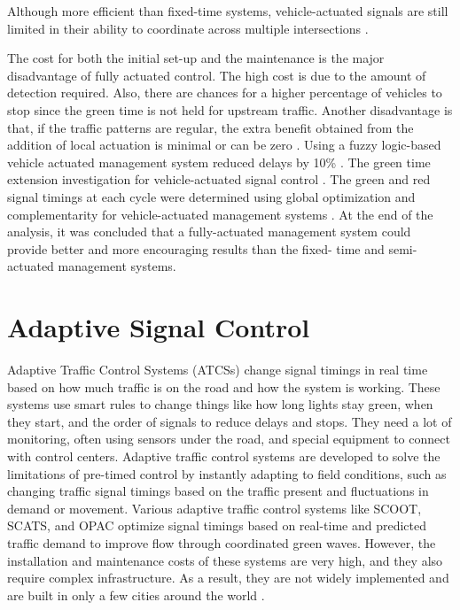 Although more efficient than fixed-time systems, vehicle-actuated 
signals are still limited in their ability to coordinate across 
multiple intersections \cite{brown2019strategies}.

The cost for both the initial set-up and the maintenance is the 
major disadvantage of fully actuated control. The high cost is 
due to the amount of detection required. Also, there are chances 
for a higher percentage of vehicles to stop since the green time 
is not held for upstream traffic. Another disadvantage is that, 
if the traffic patterns are regular, the extra benefit obtained 
from the addition of local actuation is minimal or can be zero 
\cite{fhwa2008}. Using a fuzzy logic-based vehicle actuated management 
system reduced delays by 10\% \cite{trabia1999}. The green time extension 
investigation for vehicle-actuated signal control \cite{wang2018}. 
The green and red signal timings at each cycle were determined using 
global optimization and complementarity for vehicle-actuated management 
systems \cite{ribeiro2012fully}. At the end of the analysis, it 
was concluded that a fully-actuated management system could provide 
better and more encouraging results than the fixed- time and semi-actuated 
management systems.

\section{Adaptive Signal Control}

Adaptive Traffic Control Systems (ATCSs) change signal timings in 
real time based on how much traffic is on the road and how the 
system is working. These systems use smart rules to change things 
like how long lights stay green, when they start, and the order 
of signals to reduce delays and stops. They need a lot of monitoring, 
often using sensors under the road, and special equipment to connect 
with control centers\cite{stevanovic2010}. Adaptive traffic control 
systems are developed to solve the limitations of pre-timed control 
by instantly adapting to field conditions, such as changing traffic 
signal timings based on the traffic present and fluctuations in 
demand or movement\cite{stevanovic2008}. Various adaptive traffic control 
systems like SCOOT, SCATS, and OPAC optimize signal timings based 
on real-time and predicted traffic demand to improve flow through 
coordinated green waves. However, the installation and maintenance 
costs of these systems are very high, and they also require complex 
infrastructure. As a result, they are not widely implemented and 
are built in only a few cities around the world \cite{tomar2022}.  

